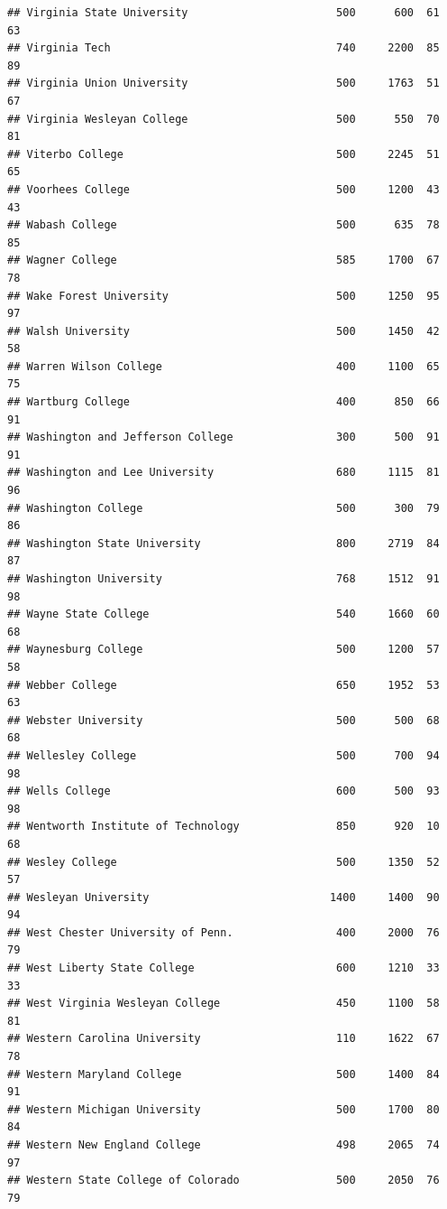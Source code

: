 \documentclass[
]{article}
\begin{document}
\begin{verbatim}
## Virginia State University                       500      600  61       63
## Virginia Tech                                   740     2200  85       89
## Virginia Union University                       500     1763  51       67
## Virginia Wesleyan College                       500      550  70       81
## Viterbo College                                 500     2245  51       65
## Voorhees College                                500     1200  43       43
## Wabash College                                  500      635  78       85
## Wagner College                                  585     1700  67       78
## Wake Forest University                          500     1250  95       97
## Walsh University                                500     1450  42       58
## Warren Wilson College                           400     1100  65       75
## Wartburg College                                400      850  66       91
## Washington and Jefferson College                300      500  91       91
## Washington and Lee University                   680     1115  81       96
## Washington College                              500      300  79       86
## Washington State University                     800     2719  84       87
## Washington University                           768     1512  91       98
## Wayne State College                             540     1660  60       68
## Waynesburg College                              500     1200  57       58
## Webber College                                  650     1952  53       63
## Webster University                              500      500  68       68
## Wellesley College                               500      700  94       98
## Wells College                                   600      500  93       98
## Wentworth Institute of Technology               850      920  10       68
## Wesley College                                  500     1350  52       57
## Wesleyan University                            1400     1400  90       94
## West Chester University of Penn.                400     2000  76       79
## West Liberty State College                      600     1210  33       33
## West Virginia Wesleyan College                  450     1100  58       81
## Western Carolina University                     110     1622  67       78
## Western Maryland College                        500     1400  84       91
## Western Michigan University                     500     1700  80       84
## Western New England College                     498     2065  74       97
## Western State College of Colorado               500     2050  76       79

\end{verbatim}
\end{document}
